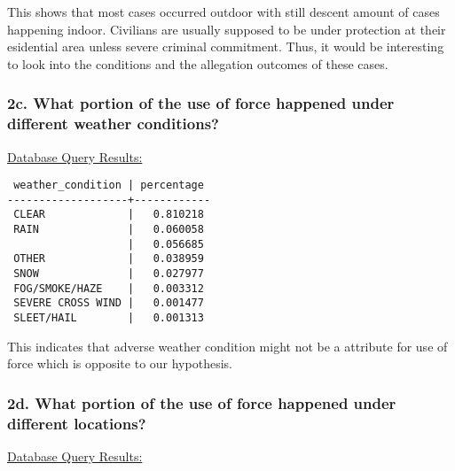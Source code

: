 \documentclass[10pt]{article}
\begin{document}
This shows that most cases occurred outdoor with still descent amount of cases happening indoor. Civilians are usually supposed to be under protection at their esidential area unless severe criminal commitment. Thus, it would be interesting to look into the conditions and the allegation outcomes of these cases.

\subsubsection*{2c. What portion of the use of force happened under different weather conditions?}

\underline{Database Query Results:}

\begin{verbatim}
 weather_condition | percentage
-------------------+------------
 CLEAR             |   0.810218
 RAIN              |   0.060058
                   |   0.056685
 OTHER             |   0.038959
 SNOW              |   0.027977
 FOG/SMOKE/HAZE    |   0.003312
 SEVERE CROSS WIND |   0.001477
 SLEET/HAIL        |   0.001313
\end{verbatim}

This indicates that adverse weather condition might not be a attribute for use of force which is opposite to our hypothesis.

\subsubsection*{2d. What portion of the use of force happened under different locations?}

\underline{Database Query Results:}
\end{document}
